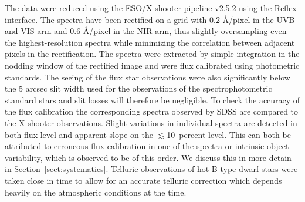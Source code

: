 \documentclass{aa}    %
\newcommand{\sectionname}{Section}
\newcommand{\Sect}[1]{\sectionname~\ref{sect:#1}}
\newcommand{\sect}[1]{\Sect{#1}}
\newcommand{\todo}[3]{{\color{#2}\emph{#1}: #3}}
\newcommand{\qtodo}[1]{\todo{Question}{red}{#1}}
\begin{document}
%
%
%
%
%

The data were reduced using the ESO/X-shooter pipeline v2.5.2\citep{Modigliani2010} using the Reflex interface\citep{Freudling2013}. The spectra have been rectified on a grid with 0.2 \AA/pixel in the UVB and VIS arm and 0.6 \AA/pixel in the NIR arm, thus slightly oversampling even the highest-resolution spectra while minimizing the correlation between adjacent pixels in the rectification. The spectra were extracted by simple integration in the nodding window of the rectified image and were flux calibrated using photometric standards\citep{Vernet2010, Hamuy1994}. The seeing of the flux star observations were also significantly below the 5 arcsec slit width used for the observations of the spectrophotometric standard stars and slit losses will therefore be negligible. To check the accuracy of the flux calibration the corresponding spectra observed by SDSS\citep{Ahn2014} are compared to the X-shooter observations. Slight variations in individual spectra are detected in both flux level and apparent slope on the $\lesssim$10~percent level. This can both be attributed to erroneous flux calibration in one of the spectra or intrinsic object variability, which is observed to be of this order\citep{MacLeod2012, Morganson2014}. We discuss this in more detain in \sect{systematics}.
Telluric observations of hot B-type dwarf stars were taken close in time to allow for an accurate telluric correction which depends heavily on the atmospheric conditions at the time.
\end{document}
